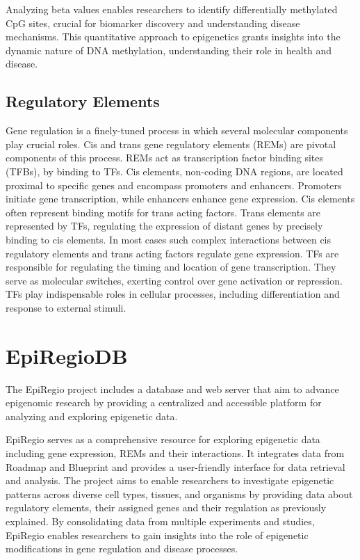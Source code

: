 \documentclass[pdftex,12pt,a4paper]{report}
\begin{document}
Analyzing beta values enables researchers to identify differentially methylated CpG sites, crucial for biomarker discovery and understanding disease mechanisms. This quantitative approach to epigenetics grants insights into the dynamic nature of DNA methylation, understanding their role in health and disease.
\subsection{Regulatory Elements}
Gene regulation is a finely-tuned process in which several molecular components play crucial roles. Cis and trans gene regulatory elements (REMs) are pivotal components of this process. REMs act as transcription factor binding sites (TFBs), by binding to TFs. 
Cis elements, non-coding DNA regions, are located proximal to specific genes and encompass promoters and enhancers. Promoters initiate gene transcription, while enhancers enhance gene expression. Cis elements often represent binding motifs for trans acting factors\cite{rems_enhancers}.
Trans elements are represented by TFs, regulating the expression of distant genes by precisely binding to cis elements. In most cases such complex interactions between cis regulatory elements and trans acting factors regulate gene expression. TFs are responsible for regulating the timing and location of gene transcription\cite{rems_cis_trans}. They serve as molecular switches, exerting control over gene activation or repression. TFs play indispensable roles in cellular processes, including differentiation and response to external stimuli\cite{rems_enhancers}.

\section{EpiRegioDB}
The EpiRegio\cite{Epi} project includes a database and web server that aim to advance
epigenomic research by providing a centralized and accessible platform for analyzing and
exploring epigenetic data. 

EpiRegio serves as a comprehensive resource for exploring epigenetic data including gene expression, REMs and their interactions. It integrates data from Roadmap\cite{roadmap} and Blueprint\cite{blueprint} and provides a user-friendly interface for data retrieval and analysis. The project aims to enable researchers to investigate epigenetic patterns across diverse cell types, tissues, and organisms by providing data about regulatory elements, their assigned genes and their regulation as previously explained. By consolidating data from multiple experiments and studies, EpiRegio enables researchers to gain insights into the role of epigenetic modifications in gene regulation and disease processes.
\end{document}
